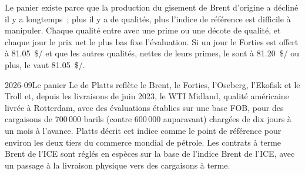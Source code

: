 \begin{omfigure}
\centering
{}

\label{fig:m3:crude-oil:complex}
\end{omfigure}

Le panier existe parce que la production du gisement de Brent d'origine a décliné il y a longtemps~;
plus il y a de qualités, plus l'indice de référence est difficile à manipuler. Chaque qualité entre
avec une prime ou une décote de qualité, et chaque jour le prix net le plus bas fixe
l'évaluation. Si un jour le Forties est offert à \qty{81.05}{\$/\barrel} et que les autres
qualités, nettes de leurs primes, le sont à \qty{81.20}{\$/\barrel} ou plus, le 
vaut \qty{81.05}{\$/\barrel}.

\begin{dated}{2026-09}{Le panier}\label{dat:m3:crude-oil:basket}
Le  de Platts reflète le Brent, le Forties, l'Oseberg, l'Ekofisk et le Troll et, depuis les
livraisons de juin 2023, le WTI Midland, qualité américaine livrée à Rotterdam, avec des évaluations
établies sur une base FOB, pour des cargaisons de 700\,000 barils (contre 600\,000 auparavant)
chargées de dix jours à un mois à l'avance. Platts décrit cet indice comme le point de référence
pour environ les deux tiers du commerce mondial de pétrole. Les contrats à terme Brent de l'ICE sont
réglés en espèces sur la base de l'indice Brent de l'ICE, avec un passage à la livraison physique vers des cargaisons à terme.
\end{dated}

